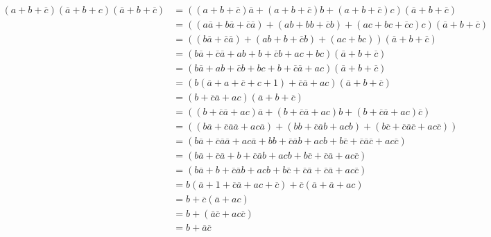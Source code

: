 \documentclass[10pt,a4paper]{article}
\begin{document}
\begin{align*}
(a + b + \overline{c})(\overline{a} + b + c)(\overline{a} + b + \overline{c}) & = ((a + b + \overline{c})\overline{a} + (a + b + \overline{c})b + (a + b + \overline{c})c)(\overline{a} + b + \overline{c})\\
& = ((a\overline{a} + b\overline{a} + \overline{c}\overline{a}) + (ab + bb + \overline{c}b) + (ac + bc + \overline{c}c)c)(\overline{a} + b + \overline{c})\\
& = ((b\overline{a} + \overline{c}\overline{a}) + (ab + b + \overline{c}b) + (ac + bc))(\overline{a} + b + \overline{c})\\
& = (b\overline{a} + \overline{c}\overline{a} + ab + b + \overline{c}b + ac + bc)(\overline{a} + b + \overline{c})\\
& = (b\overline{a} + ab + \overline{c}b + bc + b + \overline{c}\overline{a} + ac)(\overline{a} + b + \overline{c})\\
& = (b(\overline{a} + a + \overline{c} + c + 1) + \overline{c}\overline{a} + ac)(\overline{a} + b + \overline{c})\\
& = (b + \overline{c}\overline{a} + ac)(\overline{a} + b + \overline{c})\\
& = ((b + \overline{c}\overline{a} + ac)\overline{a} + (b + \overline{c}\overline{a} + ac)b + (b + \overline{c}\overline{a} + ac)\overline{c})\\
& = ((b\overline{a} + \overline{c}\overline{a}\overline{a} + ac\overline{a}) + (bb + \overline{c}\overline{a}b + acb) + (b\overline{c} + \overline{c}\overline{a}\overline{c} + ac\overline{c}))\\
& = (b\overline{a} + \overline{c}\overline{a}\overline{a} + ac\overline{a} + bb + \overline{c}\overline{a}b + acb + b\overline{c} + \overline{c}\overline{a}\overline{c} + ac\overline{c})\\
& = (b\overline{a} + \overline{c}\overline{a} + b + \overline{c}\overline{a}b + acb + b\overline{c} + \overline{c}\overline{a} + ac\overline{c})\\
& = (b\overline{a} + b + \overline{c}\overline{a}b + acb + b\overline{c} + \overline{c}\overline{a} + \overline{c}\overline{a} + ac\overline{c})\\
& = b(\overline{a} + 1 + \overline{c}\overline{a} + ac + \overline{c}) + \overline{c}(\overline{a} + \overline{a} + ac)\\
& = b + \overline{c}(\overline{a} + ac)\\
& = b + (\overline{a}\overline{c} + ac\overline{c})\\
& = b + \overline{a}\overline{c}
\end{align*}
\end{document}
